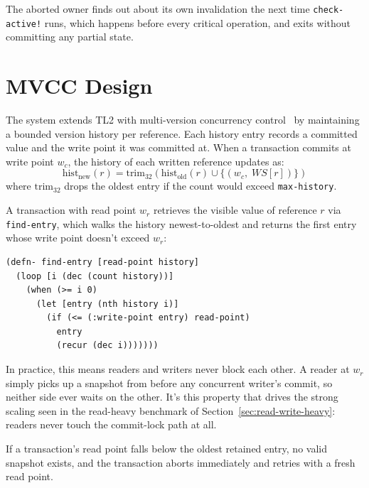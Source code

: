The aborted owner finds out about its own invalidation the next time
\texttt{check-active!} runs, which happens before every critical operation,
and exits without committing any partial state.

\section{MVCC Design}
\label{sec:mvcc-design}

The system extends TL2 with multi-version concurrency
control~\cite{bernstein1983} by maintaining a bounded version history per
reference. Each history entry records a committed value and the write point
it was committed at. When a transaction commits at write point $w_c$, the
history of each written reference updates as:
\[
  \text{hist}_{\text{new}}(r) = \text{trim}_{32}\!\left(
  \text{hist}_{\text{old}}(r) \cup \bigl\{ (w_c,\; WS[r]) \bigr\}
  \right)
\]
where $\text{trim}_{32}$ drops the oldest entry if the count would exceed
\texttt{max-history}.

A transaction with read point $w_r$ retrieves the visible value of reference
$r$ via \texttt{find-entry}, which walks the history newest-to-oldest and
returns the first entry whose write point doesn't exceed $w_r$:

\begin{listing}[H]
  \begin{verbatim}
(defn- find-entry [read-point history]
  (loop [i (dec (count history))]
    (when (>= i 0)
      (let [entry (nth history i)]
        (if (<= (:write-point entry) read-point)
          entry
          (recur (dec i)))))))
\end{verbatim}
  \caption{Version history scan. Newest-first traversal returns the latest
    version visible at the transaction's read point.}
  \label{lst:find-entry}
\end{listing}

In practice, this means readers and writers never block each other. A reader
at $w_r$ simply picks up a snapshot from before any concurrent writer's
commit, so neither side ever waits on the other. It's this property that
drives the strong scaling seen in the read-heavy benchmark of
Section~\ref{sec:read-write-heavy}: readers never touch the commit-lock
path at all.

If a transaction's read point falls below the oldest retained entry, no
valid snapshot exists, and the transaction aborts immediately and retries
with a fresh read point.

